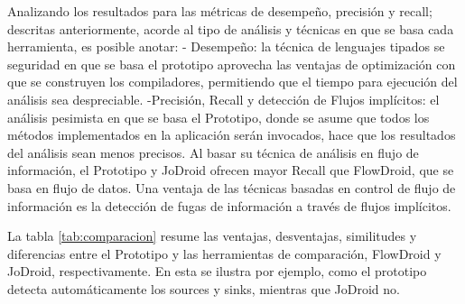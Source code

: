Analizando los resultados para las métricas de desempeño, precisión y recall;
descritas anteriormente, acorde al tipo de análisis y técnicas en que se basa
cada herramienta, es posible anotar:\newline 
- Desempeño: la técnica de lenguajes tipados se seguridad en que se basa el
prototipo aprovecha las ventajas de optimización con que se construyen los
compiladores, permitiendo que el tiempo para ejecución del análisis sea
despreciable.\newline 
-Precisión, Recall y detección de Flujos implícitos: el análisis pesimista en
que se basa el Prototipo, donde se asume que todos los métodos implementados en
la aplicación serán invocados, hace que los resultados del análisis sean menos
precisos.
Al basar su técnica de análisis en flujo de información, el Prototipo y JoDroid
ofrecen mayor Recall que FlowDroid, que se basa en flujo de datos.\newline
Una ventaja de las técnicas basadas en control de flujo de información es la
detección de fugas de información a través de flujos implícitos.\newline

La tabla \ref{tab:comparacion} resume las ventajas, desventajas, similitudes y
diferencias entre el Prototipo y las herramientas de comparación, FlowDroid y
JoDroid, respectivamente. En esta se ilustra por ejemplo, como el prototipo
detecta automáticamente los sources y sinks, mientras que JoDroid no.

